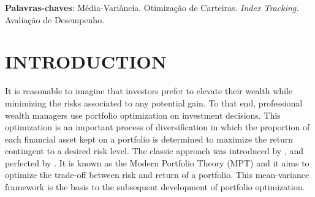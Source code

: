 \documentclass[12pt,oneside,a4paper]{memoir}
\begin{document}
\noindent 
\textbf{Palavras-chaves}: Média-Variância. Otimização de Carteiras. \textit{Index Tracking.} Avaliação de Desempenho.


\cleardoublepage
\listoffigures*



\cleardoublepage
\listoftables*


\cleardoublepage
\tableofcontents*
\cleardoublepage

\textual

\setcounter{page}{9} 

\chapter{INTRODUCTION}

It is reasonable to imagine that investors prefer to elevate their wealth while minimizing the risks associated to any potential gain.
To that end, professional wealth managers use portfolio optimization on investment decisions.
This optimization is an important process of diversification in which the proportion of each financial asset kept on a portfolio is determined to maximize the return contingent to a desired risk level.
The classic approach was introduced by , and perfected by .
It is known as the Modern Portfolio Theory (MPT) and it aims to optimize the trade-off between risk and return of a portfolio.
This mean-variance framework is the basis to the subsequent development of portfolio optimization.
\end{document}
